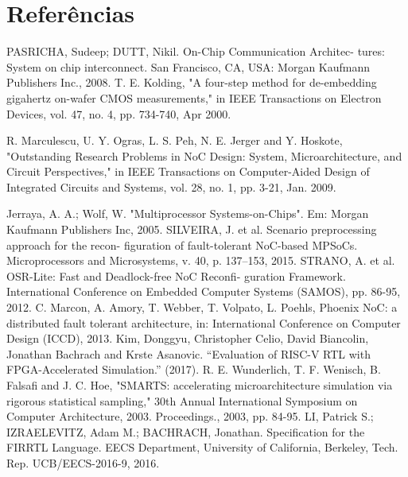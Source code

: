 \documentclass[conference]{IEEEtran}
\begin{document}
	\section*{Referências}
	\renewcommand{\section}[2]{}
	
	\begin{thebibliography}{00}
		  PASRICHA, Sudeep; DUTT, Nikil. On-Chip Communication Architec-
		tures: System on chip interconnect. San Francisco, CA, USA: Morgan Kaufmann Publishers Inc., 2008.
		T. E. Kolding, "A four-step method for de-embedding gigahertz on-wafer CMOS measurements," in IEEE Transactions on Electron Devices, vol. 47, no. 4, pp. 734-740, Apr 2000.
		
		R. Marculescu, U. Y. Ogras, L. S. Peh, N. E. Jerger and Y. Hoskote, "Outstanding Research Problems in NoC Design: System, Microarchitecture, and Circuit Perspectives," in IEEE Transactions on Computer-Aided Design of Integrated Circuits and Systems, vol. 28, no. 1, pp. 3-21, Jan. 2009.
		
		 Jerraya, A. A.; Wolf, W. "Multiprocessor Systems-on-Chips". Em: Morgan
		Kaufmann Publishers Inc, 2005.
		 SILVEIRA, J. et al. Scenario preprocessing approach for the recon-
		figuration of fault-tolerant NoC-based MPSoCs. Microprocessors and
		Microsystems, v. 40, p. 137–153, 2015.
		  STRANO, A. et al. OSR-Lite: Fast and Deadlock-free NoC Reconfi-
		guration Framework. International Conference on Embedded Computer
		Systems (SAMOS), pp. 86-95, 2012.
		 C. Marcon, A. Amory, T. Webber, T. Volpato, L. Poehls, Phoenix NoC:
		a distributed fault tolerant architecture, in: International Conference on
		Computer Design (ICCD), 2013.
		 Kim, Donggyu, Christopher Celio, David Biancolin, Jonathan Bachrach and Krste Asanovic. “Evaluation of RISC-V RTL with FPGA-Accelerated Simulation.” (2017).
		 R. E. Wunderlich, T. F. Wenisch, B. Falsafi and J. C. Hoe, "SMARTS: accelerating microarchitecture simulation via rigorous statistical sampling," 30th Annual International Symposium on Computer Architecture, 2003. Proceedings., 2003, pp. 84-95.
		 LI, Patrick S.; IZRAELEVITZ, Adam M.; BACHRACH, Jonathan. Specification for the FIRRTL Language. EECS Department, University of California, Berkeley, Tech. Rep. UCB/EECS-2016-9, 2016.
	\end{thebibliography}
	
	
\end{document}
